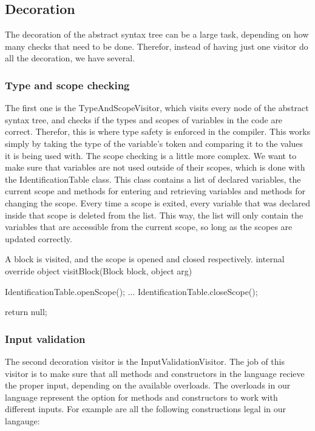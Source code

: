 \subsection{Decoration}
The decoration of the abstract syntax tree can be a large task, depending on how many checks that need to be done. 
Therefor, instead of having just one visitor do all the decoration, we have several. \newline

\subsubsection{Type and scope checking}
The first one is the TypeAndScopeVisitor, which visits every node of the abstract syntax tree, and checks if the types and scopes of variables in the code are correct.\newline
Therefor, this is where type safety is enforced in the compiler. 
This works simply by taking the type of the variable's token and comparing it to the values it is being used with. \newline
The scope checking is a little more complex. 
We want to make sure that variables are not used outside of their scopes, which is done with the IdentificationTable class. 
This class contains a list of declared variables, the current scope and methods for entering and retrieving variables and methods for changing the scope.\newline
Every time a scope is exited, every variable that was declared inside that scope is deleted from the list. 
This way, the list will only contain the variables that are accessible from the current scope, so long as the scopes are updated correctly.

\begin{source}{A block is visited, and the scope is opened and closed respectively.}{}
internal override object visitBlock(Block block, object arg)
		{
        IdentificationTable.openScope();
        ...
        IdentificationTable.closeScope();

        return null;
     }
\end{source}

\subsubsection{Input validation}
\label{inputvalidation}
The second decoration visitor is the InputValidationVisitor. 
The job of this visitor is to make sure that all methods and constructors in the language recieve the proper input, depending on the available overloads. 
The overloads in our language represent the option for methods and constructors to work with different inputs.
For example are all the following constructions legal in our langauge:

